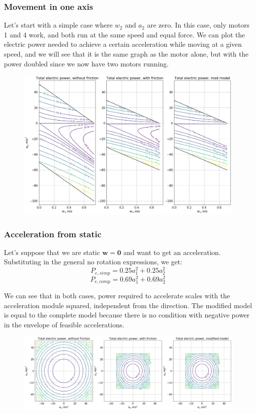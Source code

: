\documentclass[12pt]{article}
\renewcommand{\vec}[1]{\bm{#1}}
\begin{document}
\subsubsection*{Movement in one axis}
Let's start with a simple case where $w_2$ and $a_2$ are zero. In this case, only motors 1 and 4 work, and both run at the same speed and equal force. We can plot the electric power needed to achieve a certain acceleration while moving at a given speed, and we will see that it is the same graph as the motor alone, but with the power doubled since we now have two motors running.

\begin{figure}[h]
	\centering
	\includegraphics[width=1\linewidth]{total_electric_power_w_and_wout_fricc}
	\label{fig:power_f_a1_w1}
\end{figure}

\subsubsection*{Acceleration from static}
Let's suppose that we are static $\vec{w} = \vec{0}$ and want to get an acceleration. Substituting in the general no rotation expressions, we get:
$$P_{e, simp} = 0.25 a_{1}^{2} + 0.25 a_{2}^{2}$$
$$P_{e, comp} = 0.69 a_{1}^{2} + 0.69 a_{2}^{2}$$

We can see that in both cases, power required to accelerate scales with the acceleration module squared, independent from the direction. The modified model is equal to the complete model because there is no condition with negative power in the envelope of feasible accelerations.
\begin{figure}[h]
	\centering
	\includegraphics[width=1\linewidth]{power_from_static}
	\label{fig:power_from_static}
\end{figure}
\end{document}
